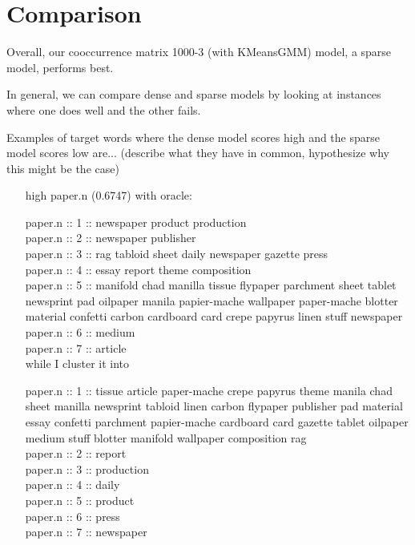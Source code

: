 \documentclass[12pt]{article}
\begin{document}
\section{Comparison}

Overall, our cooccurrence matrix 1000-3 (with KMeansGMM\textsl{})  model, a sparse model, performs best. 

In general, we can compare dense and sparse models by looking at instances where one does well and the other fails.

Examples of target words where the dense model scores high and the sparse model scores low are... (describe what they have in common, hypothesize why this might be the case)

\begin{itemize}
	\item[high] paper.n (0.6747) with oracle:
	
	paper.n :: 1 :: newspaper product production\\
	paper.n :: 2 :: newspaper publisher\\
	paper.n :: 3 :: rag tabloid sheet daily newspaper gazette press\\
	paper.n :: 4 :: essay report theme composition\\
	paper.n :: 5 :: manifold chad manilla tissue flypaper parchment sheet tablet newsprint pad oilpaper manila papier-mache wallpaper paper-mache blotter material confetti carbon cardboard card crepe papyrus linen stuff newspaper \\
	paper.n :: 6 :: medium \\
	paper.n :: 7 :: article \\
	
	while I cluster it into
	
	paper.n :: 1 :: tissue article paper-mache crepe papyrus theme manila chad sheet manilla newsprint tabloid linen carbon flypaper publisher pad material essay confetti parchment papier-mache cardboard card gazette tablet oilpaper medium stuff blotter manifold wallpaper composition rag \\
	paper.n :: 2 :: report \\
	paper.n :: 3 :: production \\
	paper.n :: 4 :: daily\\ 
	paper.n :: 5 :: product\\
	paper.n :: 6 :: press\\
	paper.n :: 7 :: newspaper\\
	

\end{itemize}
\end{document}
